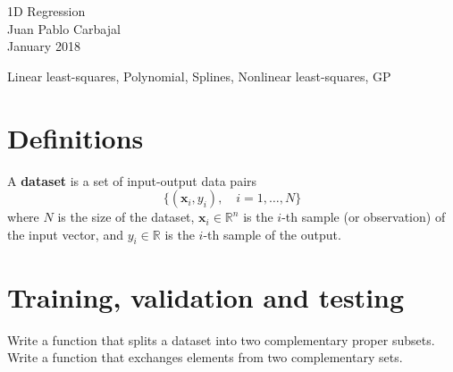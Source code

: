 \documentclass[10pt,english,final,a4paper]{exam}
\begin{document}
\begin{center}
{\Large 1D Regression}\\
Juan Pablo Carbajal\\
January 2018
\end{center}

\vspace{1.5em}

Linear least-squares, Polynomial, Splines, Nonlinear least-squares, GP

\section{Definitions}
A \textbf{dataset} is a set of input-output data pairs 
\begin{equation}
\lbrace \left(\bm{x}_i, y_i\right), \quad i = 1, \ldots, N\rbrace
\end{equation}
\noindent where $N$ is the size of the dataset, $\bm{x}_i \in \mathbb{R}^n$ is the $i$-th sample (or observation) of the input vector, and $y_i \in \mathbb{R}$
is the $i$-th sample of the output.

\section{Training, validation and testing}
\begin{questions}
Write a function that splits a dataset into two complementary proper subsets.
Write a function that exchanges elements from two complementary sets.
\end{questions}
\end{document}
